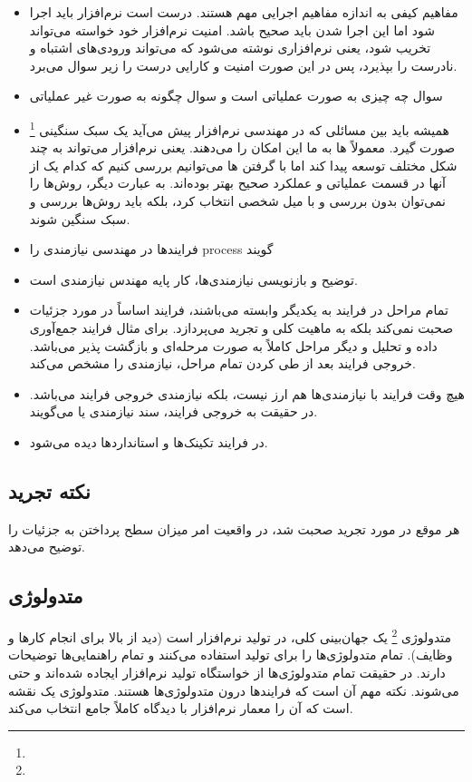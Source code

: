 \begin{itemize}
  \item مفاهیم کیفی به اندازه مفاهیم اجرایی مهم هستند. درست است نرم‌افزار باید
  اجرا شود اما این اجرا شدن باید صحیح باشد. امنیت نرم‌افزار خود خواسته می‌تواند
  تخریب شود، یعنی نرم‌افزاری نوشته می‌شود که می‌تواند ورودی‌های اشتباه و نادرست
  را بپذیرد، پس در این صورت امنیت و کارایی درست را زیر سوال می‌برد.
  \item سوال چه چیزی به صورت عملیاتی است و سوال چگونه به صورت غیر عملیاتی
  \item همیشه باید بین مسائلی که در مهندسی نرم‌افزار پیش می‌آید یک سبک سنگینی
  \footnote{} صورت گیرد. معمولاً  ها به ما این
  امکان را می‌دهند. یعنی نرم‌افزار می‌تواند به چند شکل مختلف توسعه پیدا کند اما
  با گرفتن  ها می‌توانیم بررسی کنیم که کدام یک از آنها در قسمت
  عملیاتی و عملکرد صحیح بهتر بوده‌اند. به عبارت دیگر، روش‌ها را نمی‌توان بدون
  بررسی و با میل شخصی انتخاب کرد، بلکه باید روش‌ها بررسی و سبک سنگین شوند.
  \item فرایند‌ها در مهندسی نیازمندی را process گویند
  \item توضیح و بازنویسی نیازمندی‌ها، کار پایه مهندس نیازمندی است.
  \item تمام مراحل در فرایند به یکدیگر وابسته می‌باشند، فرایند اساساً در مورد
  جزئیات صحبت نمی‌کند بلکه به ماهیت کلی و تجرید می‌پردازد. برای مثال فرایند
  جمع‌آوری داده و تحلیل و دیگر مراحل کاملاً به صورت مرحله‌ای و بازگشت پذیر
  می‌باشد. خروجی فرایند بعد از طی کردن تمام مراحل، نیازمندی را مشخص می‌کند.
  \item هیچ وقت فرایند با نیازمندی‌ها هم ارز نیست، بلکه نیازمندی خروجی فرایند
  می‌باشد. در حقیقت به خروجی فرایند، سند نیازمندی یا  می‌گویند.
  \item در فرایند تکینک‌ها و استاندارد‌ها دیده می‌شود.
\end{itemize}

\subsection{نکته تجرید}

هر موقع در مورد تجرید صحبت شد، در واقعیت امر میزان سطح پرداختن به جزئیات را
توضیح می‌دهد.

\subsection{متدولوژی}

متدولوژی \footnote{} یک جهان‌بینی کلی، در تولید نرم‌افزار است
(دید از بالا برای انجام کار‌ها و وظایف). تمام متدولوژی‌ها را برای تولید استفاده
می‌کنند و تمام راهنمایی‌ها توضیحات دارند. در حقیقت تمام متدولوژی‌ها از خواستگاه
تولید نرم‌افزار ایجاده شده‌اند و حتی می‌شوند. نکته مهم آن است که فرایند‌ها درون
متدولوژی‌ها هستند. متدولوژی یک نقشه است که آن را معمار نرم‌افزار با دیدگاه
کاملاً جامع انتخاب می‌کند.

